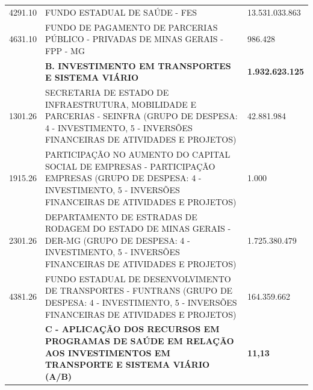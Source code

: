 \documentclass{article}
\begin{document}
\begin{longtable}[c]{m{3cm}|m{12cm}|m{3cm}}
\multicolumn{1}{C{3cm}|}{4291.10} & \multicolumn{1}{L{12cm}|}{FUNDO ESTADUAL DE SAÚDE - FES} & \multicolumn{1}{R{3cm}}{13.531.033.863} \\
\multicolumn{1}{C{3cm}|}{4631.10} & \multicolumn{1}{L{12cm}|}{FUNDO DE PAGAMENTO DE PARCERIAS PÚBLICO - PRIVADAS DE MINAS GERAIS - FPP - MG} & \multicolumn{1}{R{3cm}}{986.428} \\
\hline
\multicolumn{1}{C{3cm}|}{ \textbf{}} & \multicolumn{1}{L{12cm}|}{ \textbf{B. INVESTIMENTO EM TRANSPORTES E SISTEMA VIÁRIO}} & \multicolumn{1}{R{3cm}}{ \textbf{1.932.623.125}} \\
\multicolumn{1}{C{3cm}|}{1301.26} & \multicolumn{1}{L{12cm}|}{SECRETARIA DE ESTADO DE INFRAESTRUTURA, MOBILIDADE E PARCERIAS - SEINFRA (GRUPO DE DESPESA: 4 - INVESTIMENTO, 5 - INVERSÕES FINANCEIRAS DE ATIVIDADES E PROJETOS)} & \multicolumn{1}{R{3cm}}{42.881.984} \\
\multicolumn{1}{C{3cm}|}{1915.26} & \multicolumn{1}{L{12cm}|}{PARTICIPAÇÃO NO AUMENTO DO CAPITAL SOCIAL DE EMPRESAS - PARTICIPAÇÃO EMPRESAS (GRUPO DE DESPESA: 4 - INVESTIMENTO, 5 - INVERSÕES FINANCEIRAS DE ATIVIDADES E PROJETOS)} & \multicolumn{1}{R{3cm}}{1.000} \\
\multicolumn{1}{C{3cm}|}{2301.26} & \multicolumn{1}{L{12cm}|}{DEPARTAMENTO DE ESTRADAS DE RODAGEM DO ESTADO DE MINAS GERAIS - DER-MG (GRUPO DE DESPESA: 4 - INVESTIMENTO, 5 - INVERSÕES FINANCEIRAS DE ATIVIDADES E PROJETOS)} & \multicolumn{1}{R{3cm}}{1.725.380.479} \\
\multicolumn{1}{C{3cm}|}{4381.26} & \multicolumn{1}{L{12cm}|}{FUNDO ESTADUAL DE DESENVOLVIMENTO DE TRANSPORTES - FUNTRANS (GRUPO DE DESPESA: 4 - INVESTIMENTO, 5 - INVERSÕES FINANCEIRAS DE ATIVIDADES E PROJETOS)} & \multicolumn{1}{R{3cm}}{164.359.662} \\
\hline
\multicolumn{1}{C{3cm}|}{ \textbf{}} & \multicolumn{1}{L{12cm}|}{ \textbf{C - APLICAÇÃO DOS RECURSOS EM PROGRAMAS DE SAÚDE EM RELAÇÃO AOS INVESTIMENTOS EM TRANSPORTE E SISTEMA VIÁRIO (A/B)}} & \multicolumn{1}{R{3cm}}{ \textbf{11,13}} \\\hline\hline\end{longtable}\raggedright\fontsize{7pt}{10pt}\selectfont {Fonte: PPO.} \\\fontsize{7pt}{10pt}\selectfont {ELABORAÇÃO: DCAF/SCPPO/SEPLAG}\\\fontsize{7pt}{10pt}\\
\end{document}
